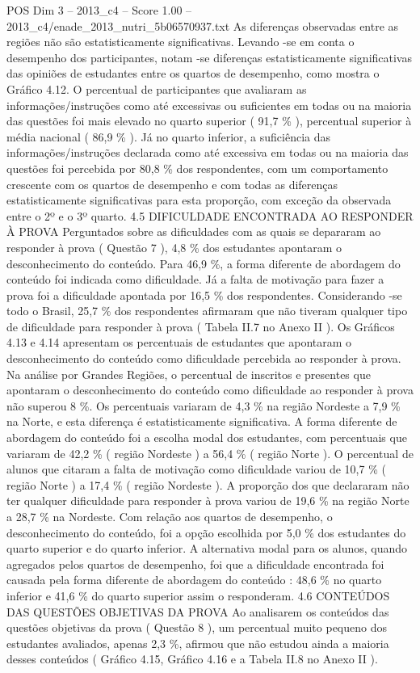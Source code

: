 \begin{textsample}{POS Dim 3 – 2013\_c4 – Score 1.00 – 2013\_c4/enade\_2013\_nutri\_5b06570937.txt}
As diferenças observadas entre as regiões não são estatisticamente significativas.
Levando -se em conta o desempenho dos participantes, notam -se diferenças estatisticamente significativas das opiniões de estudantes entre os quartos de desempenho, como mostra o Gráfico 4.12.
O percentual de participantes que avaliaram as informações/instruções como até excessivas ou suficientes em todas ou na maioria das questões foi mais elevado no quarto superior ( 91,7 \% ), percentual superior à média nacional ( 86,9 \% ).
Já no quarto inferior, a suficiência das informações/instruções declarada como até excessiva em todas ou na maioria das questões foi percebida por 80,8 \% dos respondentes, com um comportamento crescente com os quartos de desempenho e com todas as diferenças estatisticamente significativas para esta proporção, com exceção da observada entre o 2º e o 3º quarto. 4.5 DIFICULDADE ENCONTRADA AO RESPONDER À PROVA Perguntados sobre as dificuldades com as quais se depararam ao responder à prova ( Questão 7 ), 4,8 \% dos estudantes apontaram o desconhecimento do conteúdo.
Para 46,9 \%, a forma diferente de abordagem do conteúdo foi indicada como dificuldade.
Já a falta de motivação para fazer a prova foi a dificuldade apontada por 16,5 \% dos respondentes.
Considerando -se todo o Brasil, 25,7 \% dos respondentes afirmaram que não tiveram qualquer tipo de dificuldade para responder à prova ( Tabela II.7 no Anexo II ).
Os Gráficos 4.13 e 4.14 apresentam os percentuais de estudantes que apontaram o desconhecimento do conteúdo como dificuldade percebida ao responder à prova.
Na análise por Grandes Regiões, o percentual de inscritos e presentes que apontaram o desconhecimento do conteúdo como dificuldade ao responder à prova não superou 8 \%.
Os percentuais variaram de 4,3 \% na região Nordeste a 7,9 \% na Norte, e esta diferença é estatisticamente significativa.
A forma diferente de abordagem do conteúdo foi a escolha modal dos estudantes, com percentuais que variaram de 42,2 \% ( região Nordeste ) a 56,4 \% ( região Norte ).
O percentual de alunos que citaram a falta de motivação como dificuldade variou de 10,7 \% ( região Norte ) a 17,4 \% ( região Nordeste ).
A proporção dos que declararam não ter qualquer dificuldade para responder à prova variou de 19,6 \% na região Norte a 28,7 \% na Nordeste.
Com relação aos quartos de desempenho, o desconhecimento do conteúdo, foi a opção escolhida por 5,0 \% dos estudantes do quarto superior e do quarto inferior.
A alternativa modal para os alunos, quando agregados pelos quartos de desempenho, foi que a dificuldade encontrada foi causada pela forma diferente de abordagem do conteúdo : 48,6 \% no quarto inferior e 41,6 \% do quarto superior assim o responderam. 4.6 CONTEÚDOS DAS QUESTÕES OBJETIVAS DA PROVA Ao analisarem os conteúdos das questões objetivas da prova ( Questão 8 ), um percentual muito pequeno dos estudantes avaliados, apenas 2,3 \%, afirmou que não estudou ainda a maioria desses conteúdos ( Gráfico 4.15, Gráfico 4.16 e a Tabela II.8 no Anexo II ).

\end{textsample}
